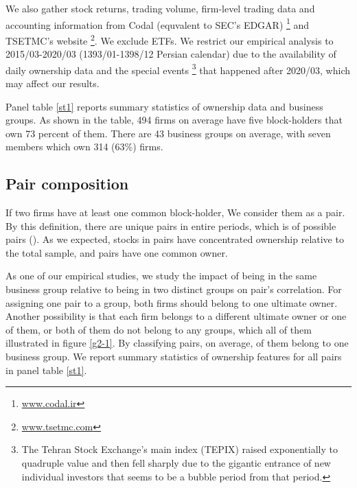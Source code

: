 	We also gather stock returns, trading volume, firm-level trading data and accounting information from Codal (equvalent to SEC's EDGAR) \footnote{\href{http://www.codal.ir}{www.codal.ir}}
and TSETMC's website \footnote{\href{http://www.tsetmc.com}{www.tsetmc.com}}. We exclude ETFs. 
We restrict our empirical analysis to 2015/03-2020/03 (1393/01-1398/12 Persian calendar) due to the availability of daily ownership data and the special events \footnote{
	The Tehran Stock Exchange's main index (TEPIX) raised exponentially to quadruple value and then fell sharply due to the gigantic entrance of new individual investors that seems to be a bubble period from that period.} that happened after 2020/03, which may affect our results. 



Panel  table \ref{st1} reports summary statistics of ownership data and business groups. As shown in the table, 494 firms on average have five block-holders that own 73 percent of them. There are 43 business groups on average, with seven members which own 314 (63\%) firms. 






\subsection{{Pair composition} }

	If two firms have at least one common block-holder, We consider them as a pair. By this definition, there are   unique pairs in entire periods, which is of possible pairs (). As we expected, stocks in pairs have concentrated ownership relative to the total sample, and pairs have one common owner.
	
	\normalcolor
	
	As one of our empirical studies, we study the impact of being in the same business group relative to being in two distinct groups on pair's correlation. 
	For assigning one pair to a group, both firms should belong to one ultimate owner. Another possibility is that each firm belongs to a different ultimate owner or one of them, or both of them do not belong to any groups, which all of them illustrated in figure \ref{g2-1}.
	By classifying pairs, on average, of them  belong to one business group. We report summary statistics of ownership features for all pairs in panel  table \ref{st1}.
	
